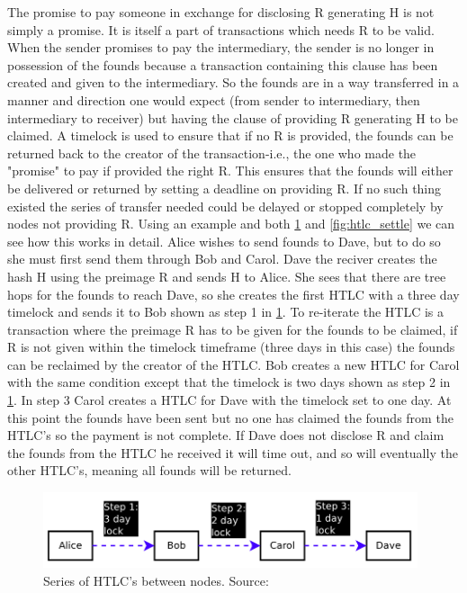 The promise to pay someone in exchange for disclosing R generating H is not simply a promise. It is itself a part of transactions which needs R to be valid. When the sender promises to pay the intermediary, the sender is no longer in possession of the founds because a transaction containing this clause has been created and given to the intermediary. So the founds are in a way transferred in a manner and direction one would expect (from sender to intermediary, then intermediary to receiver) but having the clause of providing R generating H to be claimed. A timelock is used to ensure that if no R is provided, the founds can be returned back to the creator of the transaction-i.e., the one who made the "promise" to pay if provided the right R. This ensures that the founds will either be delivered or returned by setting a deadline on providing R. If no such thing existed the series of transfer needed could be delayed or stopped completely by nodes not providing R.
Using an example and both \cref{fig:htlc_promise} and \cref{fig:htlc_settle} we can see how this works in detail.
Alice wishes to send founds to Dave, but to do so she must first send them through Bob and Carol. Dave the reciver creates the hash H using the preimage R and sends H to Alice. She sees that there are tree hops for the founds to reach Dave, so she creates the first HTLC with a three day timelock and sends it to Bob shown as step 1 in \cref{fig:htlc_promise}. To re-iterate the HTLC is a transaction where the preimage R has to be given for the founds to be claimed, if R is not given within the timelock timeframe (three days in this case) the founds can be reclaimed by the creator of the HTLC. Bob creates a new HTLC for Carol with the same condition except that the timelock is two days shown as step 2 in \cref{fig:htlc_promise}. In step 3 Carol creates a HTLC for Dave with the timelock set to one day. At this point the founds have been sent but no one has claimed the founds from the HTLC's so the payment is not complete. If Dave does not disclose R and claim the founds from the HTLC he received it will time out, and so will eventually the other HTLC's, meaning all founds will be returned.

\begin{figure}[h]
    \centering
    \includegraphics[width=11cm]{figures/htlc_promise.png}
    \caption{Series of HTLC's between nodes. Source: \cite{poon2015bitcoin}}
    \label{fig:htlc_promise}
\end{figure}

